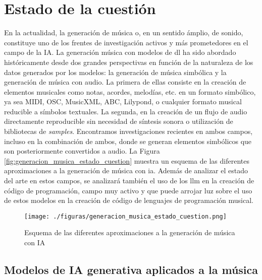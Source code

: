 \chapter{Estado de la cuestión}
\label{chap:estado_cuestion}


En la actualidad, la generación de música o, en un sentido ámplio, de sonido, constituye uno de los frentes de investigación activos y más prometedores en el campo de la IA. La generación música con modelos de \gls{dl} ha sido abordado históricamente desde dos grandes perspectivas en función de la naturaleza de los datos generados por los modelos: la generación de música simbólica y la generación de música con audio. La primera de ellas consiste en la creación de elementos musicales como notas, acordes, melodías, etc. en un formato simbólico, ya sea MIDI, OSC, MusicXML, ABC, Lilypond, o cualquier formato musical reducible a símbolos textuales. La segunda, en la creación de un flujo de audio directamente reproducible sin necesidad de síntesis sonora o utilización de bibliotecas de \textit{samples}. Encontramos investigaciones recientes en ambos campos, incluso en la combinación de ambos, donde se generan elementos simbólicos que son posteriormente convertidos a audio. La Figura \ref{fig:generacion_musica_estado_cuestion} muestra un esquema de las diferentes aproximaciones a la generación de música con \gls{ia}. Además de analizar el estado del arte en estos campos, se analizará también el uso de los \gls{llm} en la creación de código de programación, campo muy activo y que puede arrojar luz sobre el uso de estos modelos en la creación de código de lenguajes de programación musical.

\begin{figure}[H]
    \caption{Esquema de las diferentes aproximaciones a la generación de música con IA}
    \centering
    \texttt{[image: ./figuras/generacion\_musica\_estado\_cuestion.png]}
    \label{fig:generacion_musica}
\end{figure}

\section{Modelos de IA generativa aplicados a la música}

